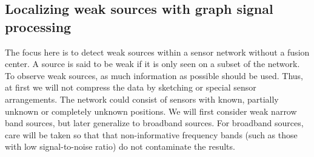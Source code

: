\subsection{Localizing weak sources with graph signal processing}
 \label{sec:weakSources}
The focus here is to detect weak sources within a sensor network without a fusion center. A source is said to be weak if it is only seen on a subset of the network. To observe weak sources, as much information as possible should be used. Thus, at first we will not compress the data by sketching or special sensor arrangements. The network could consist of sensors with known, partially unknown or completely unknown positions. We will first consider weak narrow band sources, but later generalize to broadband sources. For broadband sources, care will be taken so that that non-informative frequency bands (such as those with low signal-to-noise ratio) do not contaminate the results.



